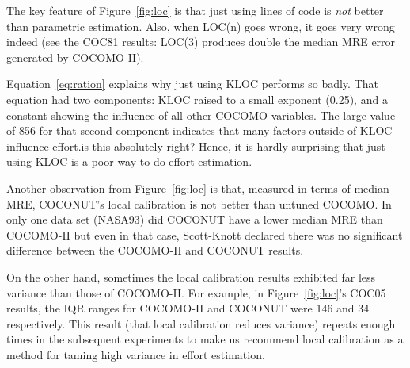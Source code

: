 \documentclass{sig-alternate}
\newcommand{\fig}[1]{Figure~\ref{fig:#1}}
\newcommand{\eq}[1]{Equation~\ref{eq:#1}}
\begin{document}
The key feature of \fig{loc}
is that  just using lines of
code is {\em not}  better than parametric estimation.
Also, when LOC(n) goes wrong, it goes very
wrong indeed (see the COC81 results: LOC(3) produces 
double the median MRE error generated by COCOMO-II).

\eq{ration} explains why just using KLOC performs so badly. 
That equation had two components: KLOC raised to
a small exponent (0.25), and a constant showing the influence of all  other
COCOMO variables. The large value of 856 for that second component
indicates that many factors outside of KLOC influence effort.{is this absolutely right?} Hence, it is hardly
surprising that just using KLOC is a poor way to do effort estimation.

Another observation from \fig{loc} is that,
measured in terms of median MRE, COCONUT's local
calibration is not  better
than  untuned COCOMO. In only one data set
(NASA93) did COCONUT have a lower median MRE than
COCOMO-II but even in that case, Scott-Knott
declared there was no significant difference between
the COCOMO-II and COCONUT results.

On the other hand, sometimes the local calibration
results exhibited far less variance than those of
COCOMO-II. For example, in \fig{loc}'s COC05
results, the IQR ranges for
COCOMO-II and COCONUT were 146 and 34 respectively.
This result (that local calibration reduces
variance) repeats enough times in the subsequent
experiments to make us recommend local calibration
as a method for taming high variance in effort
estimation.
\end{document}
